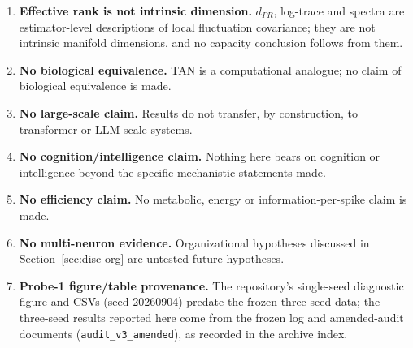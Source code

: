 \begin{enumerate}
    making the query a candidate that outranks history.
  \item \textbf{Effective rank is not intrinsic dimension.}
    $d_{PR}$, log-trace and spectra are estimator-level descriptions of
    local fluctuation covariance; they are not intrinsic manifold
    dimensions, and no capacity conclusion follows from them.
  \item \textbf{No biological equivalence.}  TAN is a computational
    analogue; no claim of biological equivalence is made.
  \item \textbf{No large-scale claim.}  Results do not transfer, by
    construction, to transformer or LLM-scale systems.
  \item \textbf{No cognition/intelligence claim.}  Nothing here bears on
    cognition or intelligence beyond the specific mechanistic
    statements made.
  \item \textbf{No efficiency claim.}  No metabolic, energy or
    information-per-spike claim is made.
  \item \textbf{No multi-neuron evidence.}  Organizational hypotheses
    discussed in Section~\ref{sec:disc-org} are untested future
    hypotheses.
  \item \textbf{Probe-1 figure/table provenance.}  The repository's
    single-seed diagnostic figure and CSVs (seed 20260904) predate the
    frozen three-seed data; the three-seed results reported here come
    from the frozen log and amended-audit documents
    (\texttt{audit\_v3\_amended}), as recorded in the archive index.
\end{enumerate}
